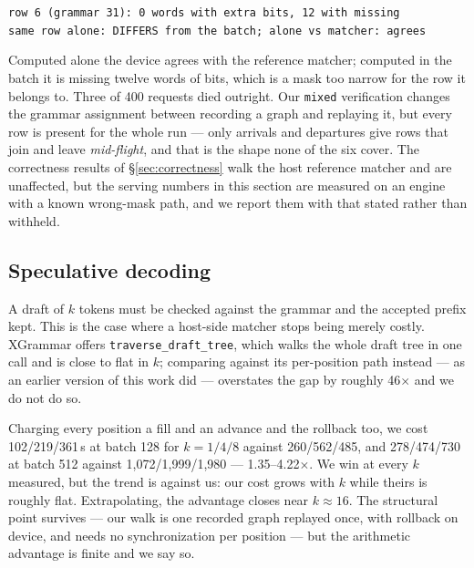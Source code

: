 \documentclass{article}
\begin{document}
\begin{center}
\begin{small}
\texttt{row 6 (grammar 31): 0 words with extra bits, 12 with missing}\\
\texttt{same row alone: DIFFERS from the batch; alone vs matcher: agrees}
\end{small}
\end{center}

Computed alone the device agrees with the reference matcher; computed in the
batch it is missing twelve words of bits, which is a mask too narrow for the
row it belongs to. Three of 400 requests died outright. Our \texttt{mixed}
verification changes the grammar assignment between recording a graph and
replaying it, but every row is present for the whole run --- only arrivals and
departures give rows that join and leave \emph{mid-flight}, and that is the
shape none of the six cover. The correctness results of
\S\ref{sec:correctness} walk the host reference matcher and are unaffected, but
the serving numbers in this section are measured on an engine with a known
wrong-mask path, and we report them with that stated rather than withheld.

\subsection{Speculative decoding}
\label{sec:eval-spec}

A draft of $k$ tokens must be checked against the grammar and the accepted
prefix kept. This is the case where a host-side matcher stops being merely
costly. XGrammar offers \texttt{traverse\_draft\_tree}, which walks the whole
draft tree in one call and is close to flat in $k$; comparing against its
per-position path instead --- as an earlier version of this work did --- overstates
the gap by roughly 46$\times$ and we do not do so.

Charging every position a fill and an advance and the rollback too, we cost
102/219/361\,\textmu{}s at batch 128 for $k=1/4/8$ against 260/562/485, and
278/474/730 at batch 512 against 1{,}072/1{,}999/1{,}980 --- 1.35--4.22$\times$.
We win at every $k$ measured, but the trend is against us: our cost grows with
$k$ while theirs is roughly flat. Extrapolating,
the advantage closes near $k\approx16$. The structural point survives ---
our walk is one recorded graph replayed once, with rollback on device, and needs
no synchronization per position --- but the arithmetic advantage is finite and we
say so.
\end{document}
